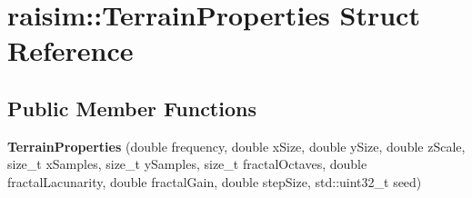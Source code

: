 \hypertarget{structraisim_1_1TerrainProperties}{}\section{raisim\+:\+:Terrain\+Properties Struct Reference}
\label{structraisim_1_1TerrainProperties}
\subsection*{Public Member Functions}
\begin{DoxyCompactItemize}
\item 
\mbox{\label{structraisim_1_1TerrainProperties_af0f0946c52806eeba85af80befae3b5c}} 
{\bfseries Terrain\+Properties} (double frequency, double x\+Size, double y\+Size, double z\+Scale, size\+\_\+t x\+Samples, size\+\_\+t y\+Samples, size\+\_\+t fractal\+Octaves, double fractal\+Lacunarity, double fractal\+Gain, double step\+Size, std\+::uint32\+\_\+t seed)
\end{DoxyCompactItemize}
